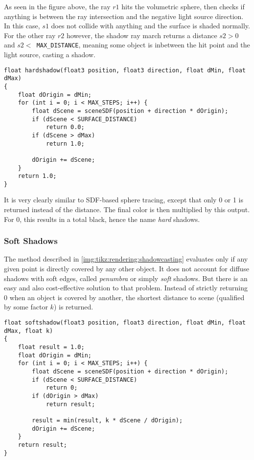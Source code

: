 \noindent
As seen in the figure above, the ray $r1$ hits the volumetric sphere, then checks if anything is between the ray intersection and the negative light source direction.
In this case, $s1$ does not collide with anything and the surface is shaded normally. 
For the other ray $r2$ however, the shadow ray march returns a distance $s2 > 0$ and $s2 < $\lstinline[language=HLSL]{ MAX_DISTANCE}, meaning some object is inbetween the hit point and the light source, casting a shadow.
\\
\begin{lstlisting}[language=HLSL, caption=Implementation of hard shadow casting., label=lst:shader:shadowcasting:hard]
float hardshadow(float3 position, float3 direction, float dMin, float dMax)
{
    float dOrigin = dMin;
    for (int i = 0; i < MAX_STEPS; i++) {
        float dScene = sceneSDF(position + direction * dOrigin);
        if (dScene < SURFACE_DISTANCE)
            return 0.0;
        if (dScene > dMax)
            return 1.0;
        
        dOrigin += dScene;
    }
    return 1.0;
}
\end{lstlisting}

\noindent
It is very clearly similar to SDF-based sphere tracing, except that only 0 or 1 is returned instead of the distance.
The final color is then multiplied by this output. For 0, this results in a total black, hence the name \textit{hard} shadows.

\subsubsection{Soft Shadows}
The method described in \autoref{img:tikz:rendering:shadowcasting} evaluates only if any given point is directly covered by any other object. 
It does not account for diffuse shadows with soft edges, called \textit{\gls{penumbra}} or simply \textit{soft} shadows. But there is an easy and also cost-effective solution to that problem.
Instead of strictly returning 0 when an object is covered by another, the shortest distance to scene (qualified by some factor $k$) is returned.

\begin{lstlisting}[language=HLSL, caption=Implementation of hard shadow casting., label=lst:shader:shadowcasting:soft]
float softshadow(float3 position, float3 direction, float dMin, float dMax, float k)
{
    float result = 1.0;
    float dOrigin = dMin;
    for (int i = 0; i < MAX_STEPS; i++) {
        float dScene = sceneSDF(position + direction * dOrigin);
        if (dScene < SURFACE_DISTANCE)
            return 0;
        if (dOrigin > dMax)
            return result;
        
        result = min(result, k * dScene / dOrigin);
        dOrigin += dScene;
    }
    return result;
}
\end{lstlisting}

